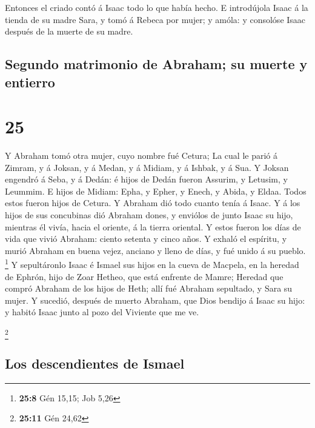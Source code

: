  Entonces el criado contó á Isaac todo lo que había
hecho.  E introdújola Isaac á la tienda de su madre Sara,
y tomó á Rebeca por mujer; y amóla: y consolóse Isaac después de la
muerte de su madre.

\hypertarget{segundo-matrimonio-de-abraham-su-muerte-y-entierro}{%
\subsection{Segundo matrimonio de Abraham; su muerte y
entierro}\label{segundo-matrimonio-de-abraham-su-muerte-y-entierro}}

\hypertarget{section-24}{%
\section{25}\label{section-24}}

 Y Abraham tomó otra mujer, cuyo nombre fué Cetura;
 La cual le parió á Zimram, y á Joksan, y á Medan, y á
Midiam, y á Ishbak, y á Sua.  Y Joksan engendró á Seba, y
á Dedán: é hijos de Dedán fueron Assurim, y Letusim, y Leummim.
 E hijos de Midiam: Epha, y Epher, y Enech, y Abida, y
Eldaa. Todos estos fueron hijos de Cetura.  Y Abraham dió
todo cuanto tenía á Isaac.  Y á los hijos de sus
concubinas dió Abraham dones, y enviólos de junto Isaac su hijo,
mientras él vivía, hacia el oriente, á la tierra oriental.
 Y estos fueron los días de vida que vivió Abraham: ciento
setenta y cinco años.  Y exhaló el espíritu, y murió
Abraham en buena vejez, anciano y lleno de días, y fué unido á su
pueblo. \footnote{\textbf{25:8} Gén 15,15; Job 5,26}  Y
sepultáronlo Isaac é Ismael sus hijos en la cueva de Macpela, en la
heredad de Ephrón, hijo de Zoar Hetheo, que está enfrente de Mamre;
 Heredad que compró Abraham de los hijos de Heth; allí
fué Abraham sepultado, y Sara su mujer.  Y sucedió,
después de muerto Abraham, que Dios bendijo á Isaac su hijo: y habitó
Isaac junto al pozo del Viviente que me ve.

\footnote{\textbf{25:11} Gén 24,62}

\hypertarget{los-descendientes-de-ismael}{%
\subsection{Los descendientes de
Ismael}\label{los-descendientes-de-ismael}}

